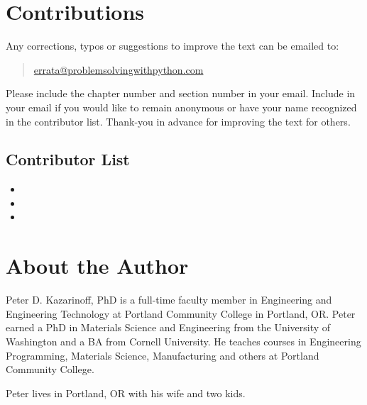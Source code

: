 \documentclass{book}
\begin{document}
    
        \section{Contributions}\label{contributions}
    




    
        Any corrections, typos or suggestions to improve the text can be emailed
to:

\begin{quote}
\url{errata@problemsolvingwithpython.com}
\end{quote}

Please include the chapter number and section number in your email.
Include in your email if you would like to remain anonymous or have your
name recognized in the contributor list. Thank-you in advance for
improving the text for others.
    




    
        \subsection{Contributor List}\label{contributor-list}

\begin{itemize}
\item
\item
\item
\end{itemize}
    




    
        \section{About the Author}\label{about-the-author}
    




    
        Peter D. Kazarinoff, PhD is a full-time faculty member in Engineering
and Engineering Technology at Portland Community College in Portland,
OR. Peter earned a PhD in Materials Science and Engineering from the
University of Washington and a BA from Cornell University. He teaches
courses in Engineering Programming, Materials Science, Manufacturing and
others at Portland Community College.

Peter lives in Portland, OR with his wife and two kids.
    




    
    
    
    
\end{document}
